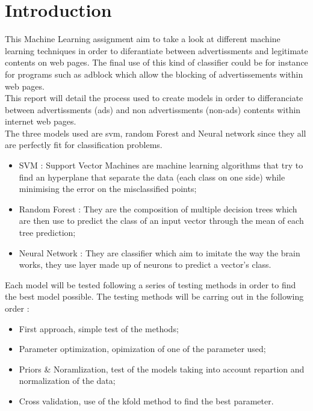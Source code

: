 \section{Introduction}

This Machine Learning assignment aim to take a look at different machine learning techniques in order to diferantiate between advertissments and legitimate contents on web pages. The final use of this kind of classifier could be for instance for programs such as adblock which allow the blocking of advertissements within web pages.\\

This report will detail the process used to create models in order to differanciate between advertissments (ads) and non advertissments (non-ads) contents within internet web pages.\\

The three models used are svm, random Forest and Neural network since they all are perfectly fit for classification problems.

\begin{itemize}
  \item SVM : Support Vector Machines are machine learning algorithms that try to find an hyperplane that separate the data (each class on one side) while minimising the error on the misclassified points;
  \item Random Forest : They are the composition of multiple decision trees which are then use to predict the class of an input vector through the mean of each tree prediction;
  \item Neural Network : They are classifier which aim to imitate the way the brain works, they use layer made up of neurons to predict a vector's class.
\end{itemize}
\vspace{\baselineskip}

Each model will be tested following a series of testing methods in order to find the best model possible.
The testing methods will be carring out in the following order :
\begin{itemize}
  \item First approach, simple test of the methods;
  \item Parameter optimization, opimization of one of the parameter used;
  \item Priors \& Noramlization, test of the models taking into account repartion and normalization of the data;
  \item Cross validation, use of the kfold method to find the best parameter.
\end{itemize}
\vspace{\baselineskip}

